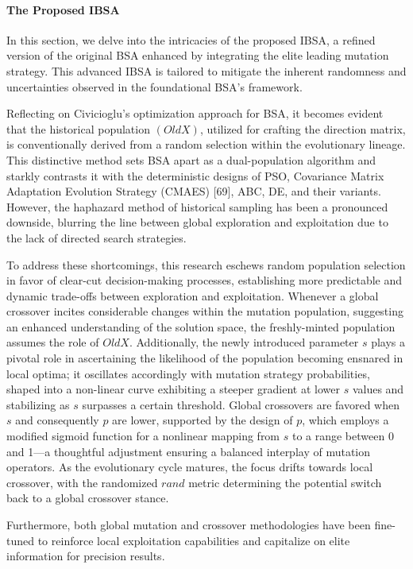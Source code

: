 \documentclass{article} %
\begin{document}
\paragraph{ The Proposed IBSA}

In this section, we delve into the intricacies of the proposed IBSA, a refined version of the original BSA enhanced by integrating the elite leading mutation strategy. This advanced IBSA is tailored to mitigate the inherent randomness and uncertainties observed in the foundational BSA's framework.

Reflecting on Civicioglu's optimization approach for BSA, it becomes evident that the historical population $(OldX)$, utilized for crafting the direction matrix, is conventionally derived from a random selection within the evolutionary lineage. This distinctive method sets BSA apart as a dual-population algorithm and starkly contrasts it with the deterministic designs of PSO, Covariance Matrix Adaptation Evolution Strategy (CMAES) [69], ABC, DE, and their variants. However, the haphazard method of historical sampling has been a pronounced downside, blurring the line between global exploration and exploitation due to the lack of directed search strategies.

To address these shortcomings, this research eschews random population selection in favor of clear-cut decision-making processes, establishing more predictable and dynamic trade-offs between exploration and exploitation. Whenever a global crossover incites considerable changes within the mutation population, suggesting an enhanced understanding of the solution space, the freshly-minted population assumes the role of $OldX$. Additionally, the newly introduced parameter $s$ plays a pivotal role in ascertaining the likelihood of the population becoming ensnared in local optima; it oscillates accordingly with mutation strategy probabilities, shaped into a non-linear curve exhibiting a steeper gradient at lower $s$ values and stabilizing as $s$ surpasses a certain threshold. Global crossovers are favored when $s$ and consequently $p$ are lower, supported by the design of $p$, which employs a modified sigmoid function for a nonlinear mapping from $s$ to a range between 0 and 1---a thoughtful adjustment ensuring a balanced interplay of mutation operators. As the evolutionary cycle matures, the focus drifts towards local crossover, with the randomized $rand$ metric determining the potential switch back to a global crossover stance.

Furthermore, both global mutation and crossover methodologies have been fine-tuned to reinforce local exploitation capabilities and capitalize on elite information for precision results.
\end{document}
